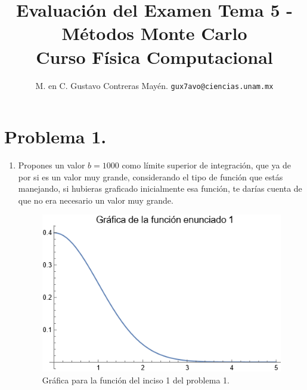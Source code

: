 

\author{M. en C. Gustavo Contreras Mayén. \texttt{gux7avo@ciencias.unam.mx}}
\title{Evaluación del Examen Tema 5 - Métodos Monte Carlo \\ {\large Curso Física Computacional}}
\date{ }


\maketitle
\fontsize{14}{14}\selectfont

\section{Problema 1.}
\begin{enumerate}
\item Propones un valor $b = 1000$ como límite superior de integración, que ya de por si es un valor muy grande, considerando el tipo de función que estás manejando, si hubieras graficado inicialmente esa función, te darías cuenta de que no era necesario un valor muy grande.
\begin{figure}[H]
    \centering
    \includegraphics[scale=0.7]{plot_P1_Inciso_01.png}
    \caption{Gráfica para la función del inciso 1 del problema 1.}
\end{figure}


\end{enumerate}
